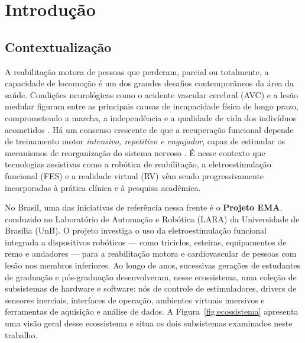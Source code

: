 \chapter{Introdução}
\label{cap:introducao}

\section{Contextualização}

A reabilitação motora de pessoas que perderam, parcial ou totalmente, a capacidade de
locomoção é um dos grandes desafios contemporâneos da área da saúde. Condições
neurológicas como o acidente vascular cerebral (AVC) e a lesão medular figuram entre as
principais causas de incapacidade física de longo prazo, comprometendo a marcha, a
independência e a qualidade de vida dos indivíduos acometidos \cite{rajashekar2024}. Há um
consenso crescente de que a recuperação funcional depende de treinamento motor
\emph{intensivo, repetitivo e engajador}, capaz de estimular os mecanismos de
reorganização do sistema nervoso \cite{loureiro2024}. É nesse contexto que tecnologias
assistivas como a robótica de reabilitação, a eletroestimulação funcional (FES) e a
realidade virtual (RV) vêm sendo progressivamente incorporadas à prática clínica e à
pesquisa acadêmica.

No Brasil, uma das iniciativas de referência nessa frente é o \textbf{Projeto EMA},
conduzido no Laboratório de Automação e Robótica (LARA) da Universidade de Brasília (UnB).
O projeto investiga o uso da eletroestimulação funcional integrada a dispositivos
robóticos --- como triciclos, esteiras, equipamentos de remo e andadores --- para a
reabilitação motora e cardiovascular de pessoas com lesão nos membros inferiores. Ao longo
de anos, sucessivas gerações de estudantes de graduação e pós-graduação
desenvolveram, nesse ecossistema, uma coleção de subsistemas de hardware e software: nós
de controle de estimuladores, drivers de sensores inerciais, interfaces de operação,
ambientes virtuais imersivos e ferramentas de aquisição e análise de dados. A
Figura~\ref{fig:ecossistema} apresenta uma visão geral desse ecossistema e situa os dois
subsistemas examinados neste trabalho.

